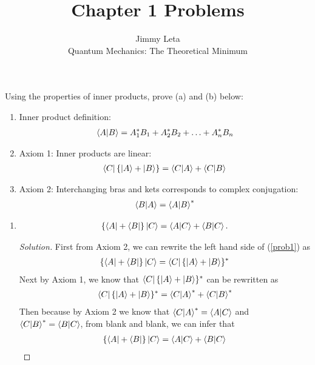 \documentclass[10pt]{article}
\newenvironment{problem}[2][Problem]{\begin{trivlist}
\item[\hskip \labelsep {\bfseries #1}\hskip \labelsep {\bfseries #2.}]}{\end{trivlist}}
\begin{document}
\title{Chapter 1 Problems}
\author{Jimmy Leta\\
  Quantum Mechanics: The Theoretical Minimum}
\maketitle

\begin{problem}{1.1}
Using the properties of inner products, prove (a) and (b) below:
\begin{enumerate}
  \item[] Inner product definition:
        \begin{align*}
          \bra{A}\ket{B} = A^*_1 B_1 + A^*_2 B_2 + \hdots + A^*_n B_n
        \end{align*}
  \item[] Axiom 1: Inner products are linear:
        \begin{align*}
          \bra{C}\{\ket{A} + \ket{B} \} = \bra{C}\ket{A} + \bra{C}\ket{B}
        \end{align*}
  \item[] Axiom 2: Interchanging bras and kets corresponds to complex conjugation:
        \begin{align*}
          \bra{B}\ket{A} = \bra{A}\ket{B}^*
        \end{align*}
\end{enumerate}
\begin{enumerate}
  \item [a)]
        \begin{align}
          \{\bra{A} + \bra{B}\}\ket{C}=\bra{A}\ket{C} + \bra{B}\ket{C}.\label{prob1}
        \end{align}
        \begin{proof}[Solution]
          First from Axiom 2, we can rewrite the left hand side of (\ref{prob1}) as
          \begin{align*}
            \{\bra{A} + \bra{B}\}\ket{C} = \bra{C}\{\ket{A} + \ket{B}\}^*
          \end{align*}
          Next by Axiom 1, we know that $\bra{C}\{\ket{A} + \ket{B}\}^*$ can be rewritten as
          \begin{align*}
            \bra{C}\{\ket{A} + \ket{B}\}^* = \bra{C}\ket{A}^* + \bra{C}\ket{B}^*
          \end{align*}
          Then because by Axiom 2 we know that $\bra{C}\ket{A}^*=\bra{A}\ket{C}$ and
          $\bra{C}\ket{B}^*=\bra{B}\ket{C}$, from blank and blank, we can infer that
          \begin{align*}
            \{\bra{A} + \bra{B}\}\ket{C}=\bra{A}\ket{C} + \bra{B}\ket{C}
          \end{align*}
        \end{proof}


\end{enumerate}
\end{problem}
\end{document}
